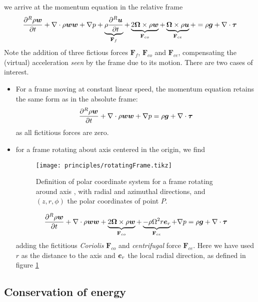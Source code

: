 we arrive at the momentum equation in the relative frame
\begin{equation}
  \frac{\partial^R \rho \boldsymbol {w}}{\partial t} + \nabla \cdot \rho \boldsymbol {w} \boldsymbol {w} + \nabla p +
  \underbrace{\rho \frac{\partial^R \boldsymbol {u}}{\partial t}}_{\mathbf F_f} + 
  \underbrace{2 \boldsymbol {\Omega} \times \rho \boldsymbol {w}}_{\mathbf F_{co}} + 
  \underbrace{\boldsymbol {\Omega} \times \rho \boldsymbol {u}}_{\mathbf F_{ce}} + 
  = \rho \boldsymbol {g} + \nabla \cdot \boldsymbol {\tau}  
  \label{eq:relativeMomentum}
\end{equation}
Note the addition of three fictious forces $\mathbf F_f$, $\mathbf
F_{co}$ and $\mathbf F_{ce}$, compensating the (virtual) acceleration
\emph{seen} by the frame due to its motion. There are two cases of
interest. 
\begin{itemize}
\item For a frame moving at constant linear speed, the momentum
  equation retains the same form as in the absolute frame:
  \begin{equation}
    \frac{\partial^R \rho \boldsymbol {w}}{\partial t} + \nabla \cdot \rho \boldsymbol {w} \boldsymbol {w} + \nabla p
    = \rho \boldsymbol {g} + \nabla \cdot \boldsymbol {\tau}  
    \label{eq:relativeMomentumLinear}
  \end{equation}
  as all fictitious forces are zero. 
\item for a frame rotating about axis  centered in the
  origin, we find
  \begin{figure}
    \centering
    \texttt{[image: principles/rotatingFrame.tikz]}
    \caption{Definition of polar coordinate system for a frame
      rotating around axis \unitV{\omega}, with radial  and
      azimuthal  directions, and $(z,r,\phi)$ the polar
      coordinates of point $P$.}
    \label{fig:polarRotatingFrame}
  \end{figure}
  \begin{equation}
    \frac{\partial^R \rho \boldsymbol {w}}{\partial t}  + 
    \nabla \cdot \rho \boldsymbol {w} \boldsymbol {w} +
    \underbrace{2 \boldsymbol {\Omega} \times \rho \boldsymbol {w}}_{\mathbf F_{co}} + 
    \underbrace{- \rho \Omega^2 r \boldsymbol e_{r}}_{\mathbf F_{ce}}  + \nabla p = \rho \boldsymbol {g} + \nabla \cdot \boldsymbol {\tau}  
    \label{eq:relativeMomentumRotating}
  \end{equation}
  adding the fictitious \emph{Coriolis} $\mathbf F_{co}$ and
  \emph{centrifugal} force $\mathbf F_{ce}$. Here we have used $r$ as
  the distance to the axis and $\boldsymbol e_{r}$ the local radial direction,
  as defined in figure \ref{fig:polarRotatingFrame}
\end{itemize}

\subsection{Conservation of energy}

